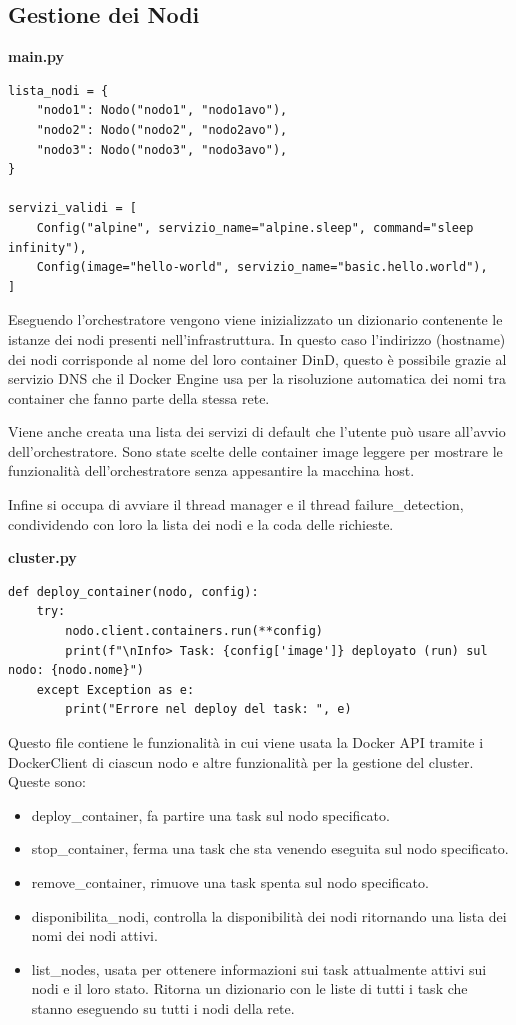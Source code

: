 \documentclass[12pt,a4paper]{article}
\begin{document}
\subsection{Gestione dei Nodi}
\begin{center}
\textbf{main.py}
\end{center}
\begin{verbatim}
lista_nodi = {
    "nodo1": Nodo("nodo1", "nodo1avo"),
    "nodo2": Nodo("nodo2", "nodo2avo"),
    "nodo3": Nodo("nodo3", "nodo3avo"),
}

servizi_validi = [
    Config("alpine", servizio_name="alpine.sleep", command="sleep infinity"),
    Config(image="hello-world", servizio_name="basic.hello.world"),
]
\end{verbatim}
Eseguendo l'orchestratore vengono viene inizializzato un dizionario contenente le istanze dei nodi presenti nell'infrastruttura. In questo caso l'indirizzo (hostname) dei nodi corrisponde al nome del loro container DinD, questo è possibile grazie al servizio DNS che il Docker Engine usa per la risoluzione automatica dei nomi tra container che fanno parte della stessa rete.

Viene anche creata una lista dei servizi di default che l'utente può usare all'avvio dell'orchestratore. Sono state scelte delle container image leggere per mostrare le funzionalità dell'orchestratore senza appesantire la macchina host.

Infine si occupa di avviare il thread manager e il thread failure\_detection, condividendo con loro la lista dei nodi e la coda delle richieste.
\begin{center}
\textbf{cluster.py}
\end{center}
\begin{verbatim}
def deploy_container(nodo, config):
    try:
        nodo.client.containers.run(**config)
        print(f"\nInfo> Task: {config['image']} deployato (run) sul nodo: {nodo.nome}")
    except Exception as e:
        print("Errore nel deploy del task: ", e)

\end{verbatim}
Questo file contiene le funzionalità in cui viene usata la Docker API tramite i DockerClient di ciascun nodo e altre funzionalità per la gestione del cluster. Queste sono:
\begin{itemize}
    \item deploy\_container, fa partire una task sul nodo specificato.
    \item stop\_container, ferma una task che sta venendo eseguita sul nodo specificato.
    \item remove\_container, rimuove una task spenta sul nodo specificato.
    \item disponibilita\_nodi, controlla la disponibilità dei nodi ritornando una lista dei nomi dei nodi attivi.
    \item list\_nodes, usata per ottenere informazioni sui task attualmente attivi sui nodi e il loro stato. Ritorna un dizionario con le liste di tutti i task che stanno eseguendo su tutti i nodi della rete.
\end{itemize}
\end{document}
